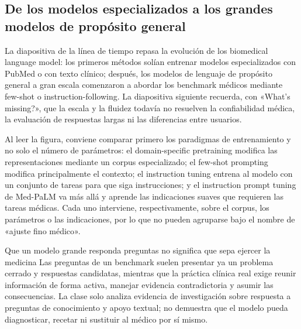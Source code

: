 \subsection{De los modelos especializados a los grandes modelos de propósito general}

La diapositiva de la línea de tiempo repasa la evolución de los biomedical language model: los primeros métodos solían entrenar modelos especializados con PubMed o con texto clínico; después, los modelos de lenguaje de propósito general a gran escala comenzaron a abordar los benchmark médicos mediante few-shot o instruction-following. La diapositiva siguiente recuerda, con «What's missing?», que la escala y la fluidez todavía no resuelven la confiabilidad médica, la evaluación de respuestas largas ni las diferencias entre usuarios.



Al leer la figura, conviene comparar primero los paradigmas de entrenamiento y no solo el número de parámetros: el domain-specific pretraining modifica las representaciones mediante un corpus especializado; el few-shot prompting modifica principalmente el contexto; el instruction tuning entrena al modelo con un conjunto de tareas para que siga instrucciones; y el instruction prompt tuning de Med-PaLM va más allá y aprende las indicaciones suaves que requieren las tareas médicas. Cada uno interviene, respectivamente, sobre el corpus, los parámetros o las indicaciones, por lo que no pueden agruparse bajo el nombre de «ajuste fino médico».

\begin{warningbox}{Que un modelo grande responda preguntas no significa que sepa ejercer la medicina}
Las preguntas de un benchmark suelen presentar ya un problema cerrado y respuestas candidatas, mientras que la práctica clínica real exige reunir información de forma activa, manejar evidencia contradictoria y asumir las consecuencias. La clase solo analiza evidencia de investigación sobre respuesta a preguntas de conocimiento y apoyo textual; no demuestra que el modelo pueda diagnosticar, recetar ni sustituir al médico por sí mismo.
\end{warningbox}

